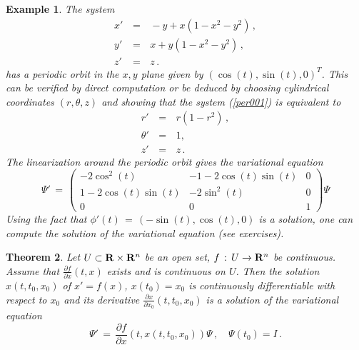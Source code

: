 \documentclass[12pt]{report}
\newcommand{\bR}{{\bf R}}
\newtheorem{theorem}{Theorem}[section]
\newtheorem{example}[theorem]{Example}
\def\eqref#1{(\ref{#1})}
\def\to{\rightarrow}
\begin{document}
\begin{example}{\rm 
 The system 
\begin{eqnarray}
x' \,&=&\, -y + x( 1- x^2 - y^2) \,, \\ 
y' \,&=&\, x + y( 1- x^2 - y^2) \,, \\
z' \,&=&\,z  \,. \label{per001}
\end{eqnarray}
has a periodic orbit in the $x,y$ plane given by  $(\cos(t), \sin(t), 0)^T$. 
This can be verified by direct computation or be deduced by choosing 
cylindrical coordinates $(r,\theta, z)$ and showing that the system \eqref{per001}
is equivalent to 
\begin{eqnarray}
r' \,&=&\, r(1-r^2) \,, \\ 
\theta' \,&=&\, 1, \\
z' \,&=&\,z  \,. \label{per01}
\end{eqnarray}
The linearization around the periodic orbit gives the variational equation 
\begin{equation}
\Psi' \,=\, \left(  \begin{array}{ccc} -2 \cos^2(t)  & -1 -2 \cos(t) \sin(t) & 0  \\ 
1 -2 \cos(t) \sin(t)  & -2 \sin^2(t) & 0 \\ 0 & 0 & 1 \end{array}
\right) \Psi
\end{equation}
Using the fact that $\phi'(t) \,=\, (-\sin(t), \cos(t), 0)$ is a solution, one can compute 
the solution of the variational equation (see exercises). 
}
\end{example}


\begin{theorem}\label{smoothdep} 
Let $U \subset \bR \times \bR^n$ be an open set, $f\,:\, 
U \to \bR^n$ be continuous. Assume that $\frac{\partial f}{\partial
x}(t,x)$ exists and is continuous on $U$.  Then the solution
$x(t,t_0,x_0)$ of $x'=f(x)$, $x(t_0)=x_0$ is continuously
differentiable with respect to $x_0$ and its derivative 
$\frac{\partial x}{\partial x_0}(t,t_0,x_0)$ is a solution of 
the variational equation
\begin{equation}\label{vvee}
\Psi' \,=\, \frac{\partial f}{\partial x}(t, x(t,t_0,x_0)) \Psi\,, \quad 
\Psi(t_0) = I \,.
\end{equation}
\end{theorem}
\end{document}
